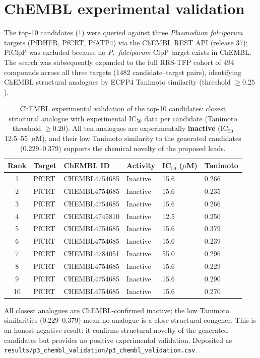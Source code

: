 \documentclass[11pt,a4paper]{article}
\begin{document}
\section{ChEMBL experimental validation}
\label{sec:chembl_validation}

The top-10 candidates (\cref{tab:chembl_validation_top10}) were queried against three \textit{Plasmodium falciparum} targets (PfDHFR, PfCRT, PfATP4) via the ChEMBL REST API (release 37); PfClpP was excluded because no \textit{P.~falciparum} ClpP target exists in ChEMBL. The search was subsequently expanded to the full RRS-TFP cohort of 494 compounds across all three targets (1482 candidate--target pairs), identifying ChEMBL structural analogues by ECFP4 Tanimoto similarity (threshold $\geq 0.25$).

\begin{table}[htbp]
\centering
\caption{ChEMBL experimental validation of the top-10 candidates: closest structural analogue with experimental IC$_{50}$ data per candidate (Tanimoto threshold $\geq 0.20$). All ten analogues are experimentally \textbf{inactive} (IC$_{50}$ 12.5--55~$\mu$M), and their low Tanimoto similarity to the generated candidates (0.229--0.379) supports the chemical novelty of the proposed leads.}
\label{tab:chembl_validation_top10}
\small
\begin{tabularx}{\textwidth}{c l l l l l}
\toprule
Rank & Target & ChEMBL ID & Activity & {IC$_{50}$ ($\mu$M)} & Tanimoto \\
\midrule
1 & PfCRT & CHEMBL4754685 & Inactive & 15.6 & 0.266 \\
2 & PfCRT & CHEMBL4754685 & Inactive & 15.6 & 0.235 \\
3 & PfCRT & CHEMBL4754685 & Inactive & 15.6 & 0.266 \\
4 & PfCRT & CHEMBL4745810 & Inactive & 12.5 & 0.250 \\
5 & PfCRT & CHEMBL4754685 & Inactive & 15.6 & 0.379 \\
6 & PfCRT & CHEMBL4754685 & Inactive & 15.6 & 0.239 \\
7 & PfCRT & CHEMBL4784051 & Inactive & 55.0 & 0.296 \\
8 & PfCRT & CHEMBL4754685 & Inactive & 15.6 & 0.229 \\
9 & PfCRT & CHEMBL4754685 & Inactive & 15.6 & 0.290 \\
10 & PfCRT & CHEMBL4754685 & Inactive & 15.6 & 0.270 \\
\bottomrule
\end{tabularx}
\vspace{1mm}
\footnotesize All closest analogues are ChEMBL-confirmed inactive; the low Tanimoto similarities (0.229--0.379) mean no analogue is a close structural congener. This is an honest negative result: it confirms structural novelty of the generated candidates but provides no positive experimental validation. Deposited as \texttt{results/p3\_chembl\_validation/p3\_chembl\_validation.csv}.
\end{table}
\end{document}
